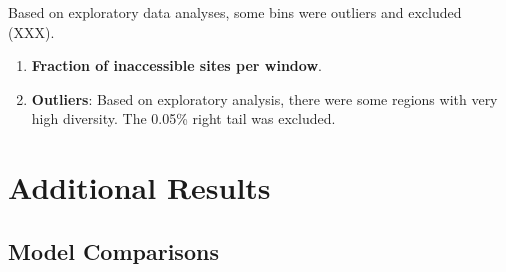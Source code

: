 \documentclass[11pt]{article}
\begin{document}
Based on exploratory data analyses, some bins were outliers and
excluded (XXX). 



\begin{enumerate}
  \item \textbf{Fraction of inaccessible sites per window}.  

  \item \textbf{Outliers}: Based on exploratory analysis, there were some
    regions with very high diversity. The 0.05\% right tail was excluded.

\end{enumerate}



\section{Additional Results}

\subsection{Model Comparisons}
\end{document}
